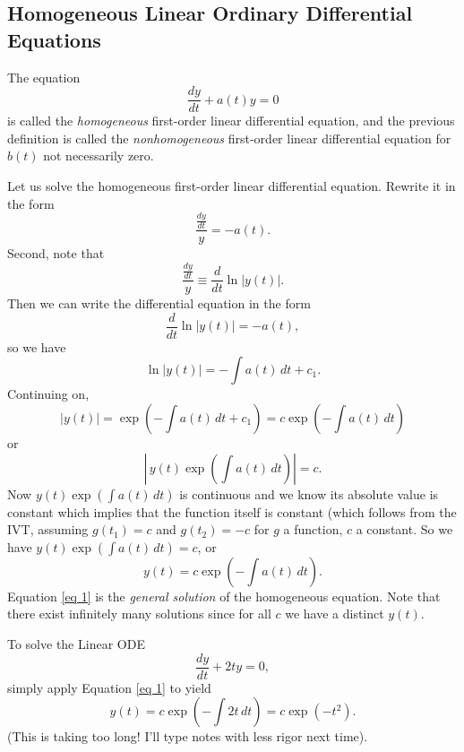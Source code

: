 \subsection{Homogeneous Linear Ordinary Differential Equations}
\begin{definition}
    The equation \[
        \frac{dy}{dt}+a(t)y=0
    \]
    is called the \emph{homogeneous} first-order linear differential equation, and the previous definition is called the \emph{nonhomogeneous} first-order linear differential equation for $b(t)$ not necessarily zero.
\end{definition}
\begin{example}
    Let us solve the homogeneous first-order linear differential equation. Rewrite it in the form \[
        \frac{\frac{dy}{dt}}{y}=-a(t).
    \]
    Second, note that \[
        \frac{\frac{dy}{dt}}{y}\equiv \frac{d}{dt}\ln |y(t)|.
    \] Then we can write the differential equation in the form \[
    \frac{d}{dt}\ln |y(t)| = -a(t),
    \] so we have \[
    \ln|y(t)|= - \int a(t) \, dt + c_1.
    \] Continuing on, \[
    |y(t)|=\exp\left( -\int a(t) \, dt + c_1 \right) = c \exp \left( - \int a(t) \, dt \right) 
    \]
    or \[
        \left| \, y(t)\exp\left( \int a(t) \, dt \right)  \right| = c.
    \]
    Now $y(t)\exp \left( \int a(t) \, dt \right) $ is continuous and we know its absolute value is constant which implies that the function itself is constant (which follows from the IVT, assuming $g(t_1)=c$ and $g(t_2)=-c$ for $g$ a function, $c$ a constant. So we have $y(t)\exp\left( \int a(t) \, dt \right) = c$, or 
    \begin{equation}\label{eq 1}
        y(t) = c \exp \left( - \int a(t) \, dt \right) .
    \end{equation}
    Equation \eqref{eq 1} is the \emph{general solution} of the homogeneous equation. Note that there exist infinitely many solutions since for all $c$ we have a distinct $y(t)$.
\end{example}
\begin{example}
    To solve the Linear ODE \[
    \frac{dy}{dt}+2ty=0,
    \]
    simply apply Equation \eqref{eq 1} to yield \[
        y(t)=c\exp\left( -\int 2t \, dt \right) = c\exp\left(-t^2 \right) .
    \] (This is taking too long! I'll type notes with less rigor next time).
\end{example}

